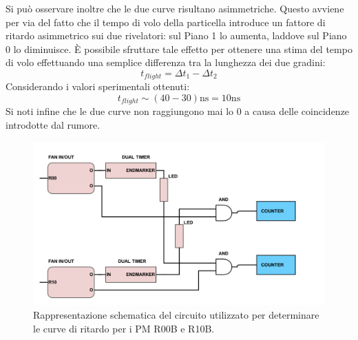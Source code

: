 \documentclass{standalone}
\begin{document}
	Si pu\`o osservare  inoltre che le due curve risultano asimmetriche. Questo avviene per via del fatto che il tempo di volo della particella introduce un fattore di ritardo asimmetrico sui due rivelatori: sul Piano 1 lo aumenta, laddove sul Piano 0 lo diminuisce. \`E possibile sfruttare tale effetto per ottenere una stima del tempo di volo effettuando una semplice differenza tra la lunghezza dei due gradini:
	\begin{equation}
	t_{flight}=\Delta t_1-\Delta t_2
	\end{equation}
	Considerando i valori sperimentali ottenuti:
	\begin{equation}
    t_{flight} \sim (40-30)\text{ns}=10\text{ns}
	\end{equation}
	Si noti infine che le due curve non raggiungono mai lo 0 a causa delle coincidenze introdotte dal rumore.
	\begin{figure}[H]
		\begin{center}
			\includegraphics[width=1.2\textwidth]{./SCHEMI/RITARDO.png} %
      \caption{\small Rappresentazione schematica del circuito utilizzato per determinare le curve di ritardo per i PM R00B e R10B.}
			\label{fig:circ-delay}
		\end{center}
	\end{figure}
\end{document}
